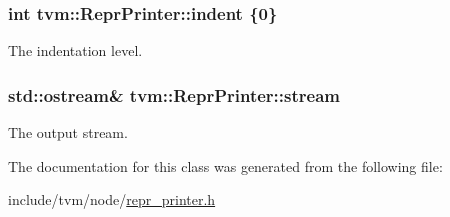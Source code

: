 \subsubsection[{\texorpdfstring{indent}{indent}}]{\setlength{\rightskip}{0pt plus 5cm}int tvm\+::\+Repr\+Printer\+::indent \{0\}}\hypertarget{classtvm_1_1ReprPrinter_ae39b784d74fbac5576f48abc37885db0}{}\label{classtvm_1_1ReprPrinter_ae39b784d74fbac5576f48abc37885db0}


The indentation level. 

\subsubsection[{\texorpdfstring{stream}{stream}}]{\setlength{\rightskip}{0pt plus 5cm}std\+::ostream\& tvm\+::\+Repr\+Printer\+::stream}\hypertarget{classtvm_1_1ReprPrinter_a036409dcdcf6f0ac5c6d7d27ec60ed94}{}\label{classtvm_1_1ReprPrinter_a036409dcdcf6f0ac5c6d7d27ec60ed94}


The output stream. 



The documentation for this class was generated from the following file\+:\begin{DoxyCompactItemize}
\item 
include/tvm/node/\hyperlink{repr__printer_8h}{repr\+\_\+printer.\+h}\end{DoxyCompactItemize}
